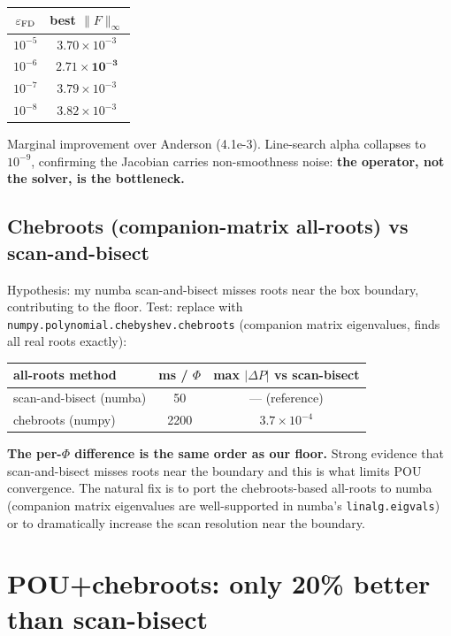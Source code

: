 \documentclass[11pt]{article}
\begin{document}
\begin{center}
\begin{tabular}{cc}
\toprule
$\varepsilon_{\rm FD}$ & best $\|F\|_\infty$ \\
\midrule
$10^{-5}$ & $3.70\!\times\!10^{-3}$ \\
$10^{-6}$ & $\mathbf{2.71\!\times\!10^{-3}}$ \\
$10^{-7}$ & $3.79\!\times\!10^{-3}$ \\
$10^{-8}$ & $3.82\!\times\!10^{-3}$ \\
\bottomrule
\end{tabular}
\end{center}

Marginal improvement over Anderson (4.1e-3). Line-search alpha collapses
to $10^{-9}$, confirming the Jacobian carries non-smoothness noise:
\textbf{the operator, not the solver, is the bottleneck.}

\subsection{Chebroots (companion-matrix all-roots) vs scan-and-bisect}

Hypothesis: my numba scan-and-bisect misses roots near the box
boundary, contributing to the floor. Test: replace with
\texttt{numpy.polynomial.chebyshev.chebroots} (companion matrix
eigenvalues, finds all real roots exactly):

\begin{center}
\begin{tabular}{lcc}
\toprule
all-roots method & ms / $\Phi$ & max $|\Delta P|$ vs scan-bisect \\
\midrule
scan-and-bisect (numba) & 50 & --- (reference) \\
chebroots (numpy) & 2200 & $3.7\!\times\!10^{-4}$ \\
\bottomrule
\end{tabular}
\end{center}

\textbf{The per-$\Phi$ difference is the same order as our floor.}
Strong evidence that scan-and-bisect misses roots near the boundary
and this is what limits POU convergence. The natural fix is to port
the chebroots-based all-roots to numba (companion matrix eigenvalues
are well-supported in numba's \texttt{linalg.eigvals}) or to dramatically
increase the scan resolution near the boundary.

\section{POU+chebroots: only 20\% better than scan-bisect}
\end{document}

